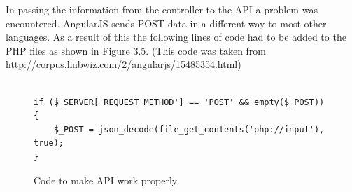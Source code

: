 In passing the information from the controller to the API a problem was encountered. AngularJS sends POST data in a different way to most other languages. As a result of this the following lines of code had to be added to the PHP files as shown in Figure 3.5. (This code was taken from \url{http://corpus.hubwiz.com/2/angularjs/15485354.html})
\begin{center} 
\begin{figure}[H]
\begin{verbatim}

if ($_SERVER['REQUEST_METHOD'] == 'POST' && empty($_POST)) {
    $_POST = json_decode(file_get_contents('php://input'), true);
}
\end{verbatim}
\caption{Code to make API work properly}
\end{figure}
\end{center}


